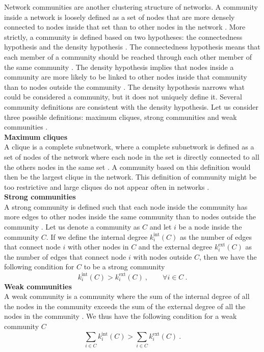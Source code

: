 \documentclass[11 pt , letterpaper , twoside , openright]{book}
\begin{document}
Network communities are another clustering structure of networks. A community inside a network is loosely defined as a set of nodes that are more densely connected to nodes inside that set than to other nodes in the network \cite{Saha2015}. More strictly, a community is defined based on two hypotheses: the connectedness hypothesis and the density hypothesis \cite{Albert2016}. The connectedness hypothesis means that each member of a community should be reached through each other member of the same community \cite{Albert2016}. The density hypothesis implies that nodes inside a community are more likely to be linked to other nodes inside that community than to nodes outside the community \cite{Albert2016}. The density hypothesis narrows what could be considered a community, but it does not uniquely define it. Several community definitions are consistent with the density hypothesis. Let us consider three possible definitions: maximum cliques, strong communities and weak communities \cite{Albert2016}.\\
\newline
\textbf{Maximum cliques}\\
\newline
A clique is a complete subnetwork, where a complete subnetwork is defined as a set of nodes of the network where each node in the set is directly connected to all the others nodes in the same set \cite{Albert2016}. A community based on this definition would then be the largest clique in the network. This definition of community might be too restrictive and large cliques do not appear often in networks \cite{Albert2016}.\\   
\newpage
\noindent
\textbf{Strong communities}\\
\newline
A strong community is defined such that each node inside the community has more edges to other nodes inside the same community than to nodes outside the community \cite{Albert2016}\cite{F.Costa2007}. Let us denote a community as $C$ and let $i$ be a node inside the community $C$. If we define the internal degree $k_i^{\textrm{int}}(C)$ as the number of edges that connect node $i$ with other nodes in $C$ and the external degree $k_i^{\textrm{ext}}(C)$ as the number of edges that connect node $i$ with nodes outside $C$, then we have the following condition for $C$ to be a strong community \cite{Albert2016}
\begin{equation}
	k_i^{\textrm{int}}(C) > k_i^{\textrm{ext}}(C) \ , \qquad \forall i \in C \ .
\end{equation}
\newline
\textbf{Weak communities}\\
\newline
A weak community is a community where the sum of the internal degree of all the nodes in the community exceeds the sum of the external degree of all the nodes in the community \cite{Albert2016}\cite{F.Costa2007}. We thus have the following condition for a weak community $C$ \cite{Albert2016}
\begin{equation}
	\sum_{i \in C} k_i^{\textrm{int}}(C) > \sum_{i \in C}k_i^{\textrm{ext}}(C) \ .
\end{equation}
\end{document}
